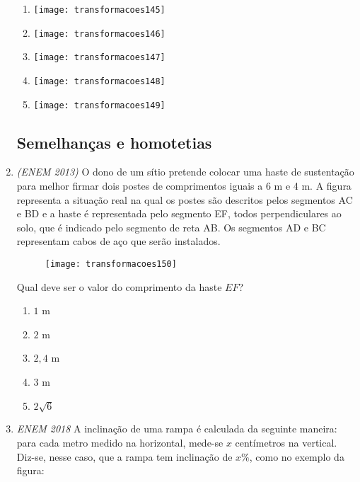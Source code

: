 \begin{enumerate}
\begin{multicols}{2}
\begin{enumerate}
\item {}
{
\texttt{[image: transformacoes145]}
}
\item {}
{
\texttt{[image: transformacoes146]}
}
\item {}
{
\texttt{[image: transformacoes147]}
}
\item {}
{
\texttt{[image: transformacoes148]}
}
\item {}
{
\texttt{[image: transformacoes149]}
}
\end{enumerate}
\end{multicols}

\subsection{Semelhanças e homotetias}


\item \textit{(ENEM 2013)} O dono de um sítio pretende colocar uma haste de sustentação para melhor firmar dois postes de comprimentos iguais a 6 m e 4 m. A figura representa a situação real na qual os postes são descritos pelos segmentos AC e BD e a haste é representada pelo segmento EF, todos perpendiculares ao solo, que é indicado pelo segmento de reta AB. Os segmentos AD e BC representam cabos de aço que serão instalados. 

\begin{figure}[H]
\centering

\texttt{[image: transformacoes150]}
\end{figure}

Qual deve ser o valor do comprimento da haste $EF$?

\begin{enumerate}
\item $1$ m
\item $2$ m
\item $2{,}4$ m
\item $3$ m
\item $2\sqrt{6}$
\end{enumerate}


\item \textit{ENEM 2018} A inclinação de uma rampa é calculada da seguinte maneira: para cada metro medido na horizontal, mede-se $x$ centímetros na vertical. Diz-se, nesse caso, que a rampa tem inclinação de $x\%$, como no exemplo da figura:


\end{enumerate}
